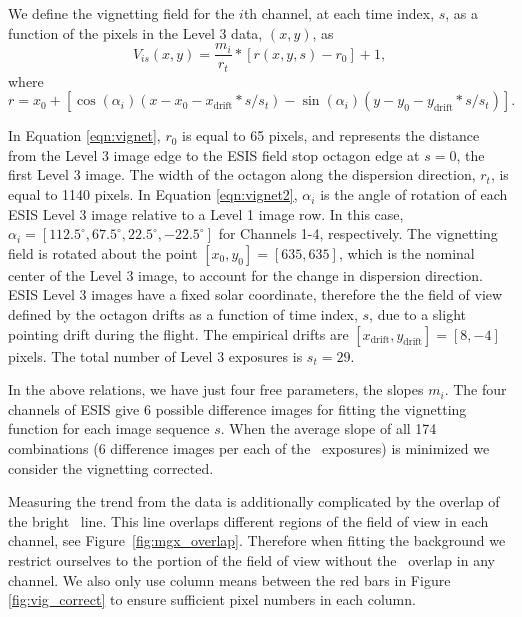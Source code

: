 We define the vignetting field for the $i$th channel, at each time index, $s$, as a function of the pixels in the Level 3 data, $(x,y)$, as 
	\begin{equation}
		V_{is}(x,y) = \frac{m_i}{r_t} * [r(x,y,s) - r_0] + 1,
		\label{eqn:vignet}
	\end{equation}
where
	\begin{equation}
		r = x_0 + [\cos(\alpha_i)(x-x_0-x_{\text{drift}}*s/s_t) - \sin(\alpha_i)(y-y_0-y_{\text{drift}}*s/s_t)].
		\label{eqn:vignet2}
	\end{equation}

In Equation \ref{eqn:vignet}, $r_0$ is equal to 65 pixels, and represents the distance from the Level 3 image edge to the ESIS field stop octagon edge at $s = 0$, the first Level 3 image.
The width of the octagon along the dispersion direction, $r_t$, is equal to 1140 pixels.
In Equation \ref{eqn:vignet2},  $\alpha_i$ is the angle of rotation of each ESIS Level 3 image relative to a Level 1 image row.
In this case, $\alpha_i = [112.5^{\circ}, 67.5^{\circ}, 22.5^{\circ}, -22.5^{\circ}]$ for Channels 1-4, respectively.
The vignetting field is rotated about the point $[x_0, y_0] = [635,635]$, which is the nominal center of the Level 3 image, to account for the change in dispersion direction.
ESIS Level 3 images have a fixed solar coordinate, therefore the the field of view defined by the octagon drifts as a function of time index, $s$, due to a slight pointing drift during the flight. 
The empirical drifts are $[x_{\text{drift}},y_{\text{drift}}] = [8, -4]$ pixels. 
The total number of Level 3 exposures is $s_t=29$. 


In the above relations, we have just four free parameters, the slopes $m_i$. 
The four channels of ESIS give 6 possible difference images for fitting the vignetting function for each image sequence $s$. 
When the average slope of all 174 combinations (6 difference images per each of the \numDataFrames \ exposures) is minimized we consider the vignetting corrected.

Measuring the trend from the data is additionally complicated by the overlap of the bright \mgxbright \ line.  
This line overlaps different regions of the field of view in each channel, see Figure~\ref{fig:mgx_overlap}.  
Therefore when fitting the background we restrict ourselves to the portion of the field of view without the \mgxbright \ overlap in any channel.
We also only use column means between the red bars in Figure \ref{fig:vig_correct} to ensure sufficient pixel numbers in each column.  

